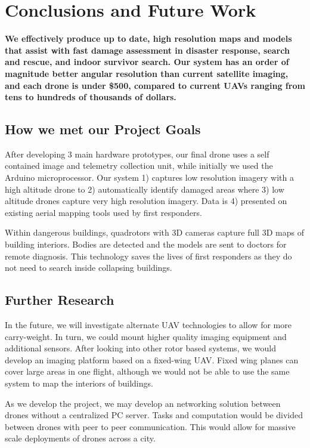 
\section{Conclusions and Future Work}		%

\textbf{We effectively produce up to date, high resolution maps and models that assist with fast damage
assessment in disaster response, search and rescue, and indoor survivor search. Our system has an order of
magnitude better angular resolution than current satellite imaging, and each drone is under \$500,
compared to current UAVs ranging from tens to hundreds of thousands of dollars.}

\subsection{How we met our Project Goals}

After developing 3 main hardware prototypes, our final drone uses a self contained image and telemetry
collection unit, while initially we used the Arduino microprocessor.
Our system 1) captures low resolution imagery with a high altitude drone to 2) automatically identify damaged areas where 3) low altitude drones capture very high resolution imagery. Data is 4) presented on existing aerial mapping tools used by first responders.

Within dangerous buildings, quadrotors with 3D cameras capture full 3D maps of building interiors. Bodies are detected and the models are sent to doctors for remote diagnosis.
This technology saves the lives of first responders as they do not need to search inside collapsing buildings.

\subsection{Further Research}
In the future, we will investigate alternate UAV technologies to allow for more carry-weight. In turn, we could mount higher quality imaging equipment and additional sensors. After looking into other rotor based systems, we would develop an imaging platform based on a fixed-wing UAV. Fixed wing planes can cover large areas in one flight, although we would not be able to use the same system to map the interiors of buildings.

As we develop the project, we may develop an networking solution between drones without a centralized PC server. Tasks and computation would be divided between drones with peer to peer communication. This would allow for massive scale deployments of drones across a city.